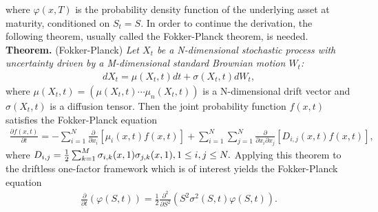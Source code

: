 \documentclass[a4paper, 12pt]{article}
\numberwithin{equation}{subsection}
\begin{document}
where $\varphi(x,T)$ is the probability density function of the underlying asset at maturity, conditioned on $S_t = S$. In order to continue the derivation, the following theorem, usually called the Fokker-Planck theorem, is needed.
\\

\textbf{Theorem. }(Fokker-Planck) \textit{Let \textbf{$X_t$} be a N-dimensional stochastic process with uncertainty driven by a M-dimensional standard Brownian motion \textbf{$W_t$}:}
\begin{align}
	 d X_t = \mu (X_t,t)dt + \sigma(X_t,t)dW_t,
\end{align}
where $\mu(X_t,t) = (\mu(X_t,t) \cdots \mu _n(X_t,t))$ is a N-dimensional drift vector and $\sigma (X_t,t)$ is a diffusion tensor. Then the joint probability function $f(x, t)$ satisfies the Fokker-Planck equation
\begin{align}
\frac{\partial f(x,t)}{\partial t} = -\sum_{i=1}^{N}\frac{\partial}{\partial x_i}[\mu_i(x,t)f(x,t)]+\sum_{i=1}^N\sum_{j=1}^N\frac{\partial}{\partial x_i \partial x_j}[D_{i,j}(x,t)f(x,t)],
\end{align}
where $D_{i,j} = \frac{1}{2}\sum_{k=1}^M\sigma_{i,k}(x,1)\sigma_{j,k}(x,1), 1\leq i,j \leq N.\\ $
Applying this theorem to the driftless one-factor framework which is of interest yields the Fokker-Planck equation
\begin{align}\label{EQimpFK}
	 \frac{\partial}{\partial t}(\varphi(S,t)) = \frac{1}{2}\frac{\partial ^2}{\partial S^2}(S^2\sigma^2(S,t)\varphi(S,t)).
\end{align}
\\
\end{document}
